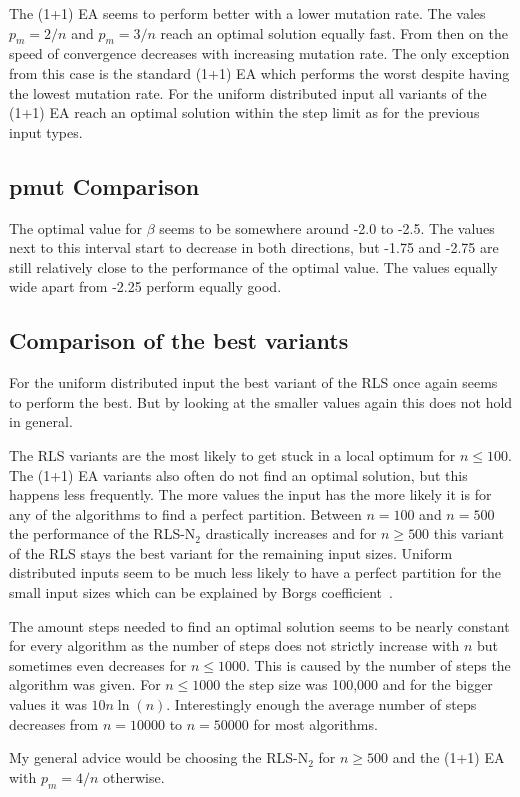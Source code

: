 

The (1+1) EA seems to perform better with a lower mutation rate.
The vales $p_m=2/n$ and $p_m=3/n$ reach an optimal solution equally fast.
From then on the speed of convergence decreases with increasing mutation rate.
The only exception from this case is the standard (1+1) EA which performs the worst despite having the lowest mutation rate.
For the uniform distributed input all variants of the (1+1) EA reach an optimal solution within the step limit as for the previous input types.
\subsection{pmut Comparison}




The optimal value for $\beta$ seems to be somewhere around -2.0 to -2.5.
The values next to this interval start to decrease in both directions, but -1.75 and -2.75 are still relatively close to the performance of the optimal value.
The values equally wide apart from -2.25 perform equally good.

\subsection{Comparison of the best variants}




For the uniform distributed input the best variant of the RLS once again seems to perform the best.
But by looking at the smaller values again this does not hold in general.



The RLS variants are the most likely to get stuck in a local optimum for $n\le100$.
The (1+1) EA variants also often do not find an optimal solution, but this happens less frequently.
The more values the input has the more likely it is for any of the algorithms to find a perfect partition.
Between $n=100$ and $n=500$ the performance of the RLS-N$_2$ drastically increases and for $n\ge500$ this variant of the RLS stays the best variant for the remaining input sizes.
Uniform distributed inputs seem to be much less likely to have a perfect partition for the small input sizes which can be explained by Borgs coefficient~\cite{borgs2001phase}.



The amount steps needed to find an optimal solution seems to be nearly constant for every algorithm as the number of steps does not strictly increase with $n$ but sometimes even decreases for $n\le1000$.
This is caused by the number of steps the algorithm was given.
For $n\le1000$ the step size was 100,000 and for the bigger values it was $10n\ln(n)$.
Interestingly enough the average number of steps decreases from $n=10000$ to $n=50000$ for most algorithms.



My general advice would be choosing the RLS-N$_2$ for $n\ge500$ and the (1+1) EA with $p_m=4/n$ otherwise.
